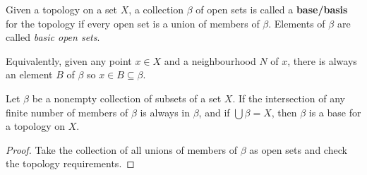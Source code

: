 \begin{definition}
    Given a topology on a set $X$, a collection $\beta$ of open sets is called a \textbf{base/basis} for the topology if every open set is a union of members of $\beta$. Elements of $\beta$ are called \emph{basic open sets}.

    Equivalently, given any point $x \in X$ and a neighbourhood $N$ of $x$, there is always an element $B$ of $\beta$ so $x\in B\subseteq\beta$.
\end{definition}
\begin{theorem}
    Let $\beta$ be a nonempty collection of subsets of a set $X$. If the intersection of any finite number of members of $\beta$ is always in $\beta$, and if $\bigcup\beta=X$, then $\beta$ is a base for a topology on $X$.
\end{theorem}
\begin{proof}
    Take the collection of all unions of members of $\beta$ as open sets and check the topology requirements.
\end{proof}